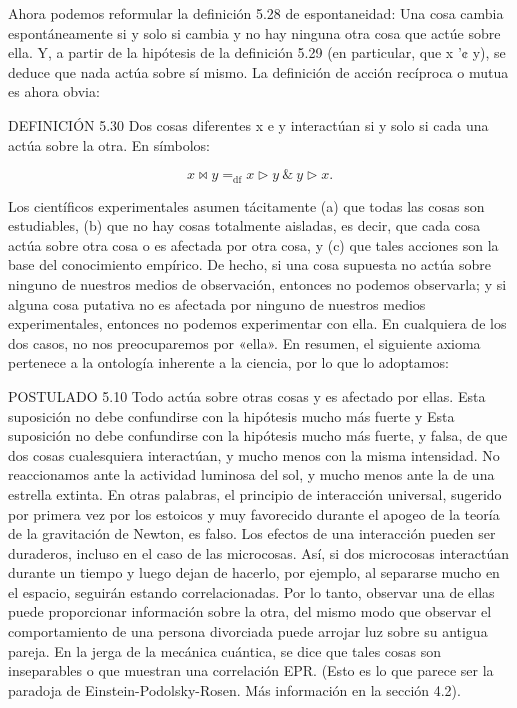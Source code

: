 \begin{justifying}
    Ahora podemos reformular la definición 5.28 de espontaneidad: Una cosa
    cambia espontáneamente si y solo si cambia y no hay ninguna otra cosa que
    actúe sobre ella. Y, a partir de la hipótesis de la definición 5.29 (en particular,
    que x '¢ y), se deduce que nada actúa sobre sí mismo.
    La definición de acción recíproca o mutua es ahora obvia:

    DEFINICIÓN 5.30 Dos cosas diferentes x e y interactúan si y solo si cada una actúa sobre
    la otra. En símbolos:

    \begin{center}
        $$ x \bowtie y =_{\text{df}} x \rhd y \ \& \ y \rhd x. $$
    \end{center}

    Los científicos experimentales asumen tácitamente (a) que todas las cosas son estudiables,
    (b) que no hay cosas totalmente aisladas, es decir, que cada cosa actúa sobre otra cosa
    o es afectada por otra cosa, y (c) que tales acciones son la base
    del conocimiento empírico. De hecho, si una cosa supuesta no actúa sobre ninguno
    de nuestros medios de observación, entonces no podemos observarla; y si alguna
    cosa putativa no es afectada por ninguno de nuestros medios experimentales, entonces
    no podemos experimentar con ella. En cualquiera de los dos casos, no nos preocuparemos por «ella». En
    resumen, el siguiente axioma pertenece a la ontología inherente a la ciencia,
    por lo que lo adoptamos:

    POSTULADO 5.10 Todo actúa sobre otras cosas y es afectado por ellas.
    Esta suposición no debe confundirse con la hipótesis mucho más fuerte y
    Esta suposición no debe confundirse con la hipótesis mucho más fuerte, y
    falsa, de que dos cosas cualesquiera interactúan, y mucho menos con la misma
    intensidad. No reaccionamos ante la actividad luminosa del sol, y mucho menos
    ante la de una estrella extinta. En otras palabras, el principio de interacción universal,
    sugerido por primera vez por los estoicos y muy favorecido durante el
    apogeo de la teoría de la gravitación de Newton, es falso.
    Los efectos de una interacción pueden ser duraderos, incluso en el caso de
    las microcosas. Así, si dos microcosas interactúan durante un tiempo y luego dejan
    de hacerlo, por ejemplo, al separarse mucho en el espacio, seguirán
    estando correlacionadas. Por lo tanto, observar una de ellas puede proporcionar
    información sobre la otra, del mismo modo que observar el comportamiento de una
    persona divorciada puede arrojar luz sobre su antigua pareja. En la jerga de la
    mecánica cuántica, se dice que tales cosas son inseparables o que
    muestran una correlación EPR. (Esto es lo que parece ser la paradoja de Einstein-Podolsky-Rosen.
    Más información en la sección 4.2).


\end{justifying}
